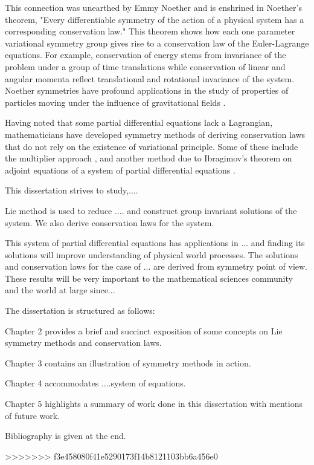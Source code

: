  
This connection was unearthed by Emmy Noether and is enshrined in Noether's theorem, "Every differentiable symmetry of the action of a physical system has a corresponding conservation law." This theorem shows how each one parameter variational symmetry group gives rise to a conservation law of the Euler-Lagrange equations. For example, conservation of energy stems from invariance of the problem under a group of time translations while conservation of linear and angular momenta reflect translational and rotational invariance of the system. Noether symmetries have profound applications in the study of properties of particles moving under the influence of gravitational fields \citep{olver2000applications}.

Having noted that some partial differential equations lack a Lagrangian, mathematicians have  developed symmetry  methods of deriving conservation laws that do not rely on the existence of variational principle. Some of these include the multiplier approach \cite{naz2012conservation}, \citep{bluman2010applications}
and another method due to Ibragimov's theorem on adjoint equations of a system of partial differential equations \citep{ibragimov2009practical}.

This dissertation strives to study,....

Lie method is used to reduce .... and construct group invariant solutions of the system. We also derive conservation laws for the system. 

This system of partial differential equations has applications in ... and finding its solutions will improve understanding of physical world processes. The solutions and conservation laws for the case of ... are derived from symmetry point of view. These results will be very important to the mathematical sciences community and the world at large since...

The dissertation  is structured as follows:

Chapter 2 provides a brief and succinct exposition of some concepts on Lie symmetry methods and conservation laws.

Chapter 3 contains an illustration of symmetry methods in action.

Chapter 4 accommodates ....system of equations.

Chapter 5 highlights a summary of work done in this dissertation with mentions of future work.

Bibliography is given at the end.


>>>>>>> f3e458080f41e5290173f14b8121103bb6a456e0
